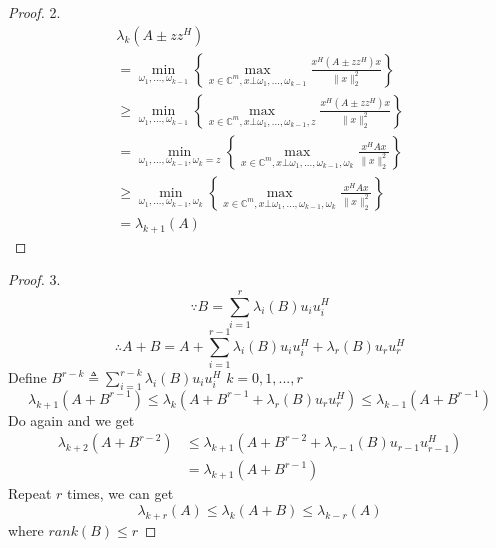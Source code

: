 \begin{multicols}{2}
\begin{proof} 2.
    \[
        \begin{array}{l}
            \lambda_k(A \pm zz^H) \\ 
            = \underset{\omega_1,...,\omega_{k-1}}{\min} \left\{\underset{x\in\mathbb{C}^m,x\bot \omega_1,...,\omega_{k-1}}{\max} \frac{x^H(A\pm zz^H)x}{\|x\|_2^2}\right\} \\
            \geq \underset{\omega_1,...,\omega_{k-1}}{\min} \left\{\underset{x\in\mathbb{C}^m,x\bot \omega_1,...,\omega_{k-1},\boxed{z}}{\max} \frac{x^H(A\pm zz^H)x}{\|x\|_2^2}\right\} \\
            = \underset{\omega_1,...,\omega_{k-1},\omega_k=z}{\min} \left\{\underset{x\in\mathbb{C}^m,x\bot \omega_1,...,\omega_{k-1},\omega_k}{\max} \frac{x^HAx}{\|x\|_2^2}\right\} \\
            \geq \underset{\omega_1,...,\omega_{k-1},\omega_k}{\min} \left\{\underset{x\in\mathbb{C}^m,x\bot \omega_1,...,\omega_{k-1},\omega_k}{\max} \frac{x^HAx}{\|x\|_2^2}\right\} \\
            = \lambda_{k+1}(A)
        \end{array}
    \]
\end{proof}

\begin{proof} 3.
    \[
        \because B=\sum_{i=1}^r \lambda_i(B)u_iu_i^H
    \]
    \[
        \therefore A+B = A + \sum_{i=1}^{r-1} \lambda_i(B)u_iu_i^H + \lambda_r(B)u_ru_r^H
    \]
    Define $B^{r-k}\triangleq \sum_{i=1}^{r-k} \lambda_i(B)u_iu_i^H$ $k=0,1,...,r$
    \[
        \lambda_{k+1}(A+B^{r-1}) \leq \lambda_k(A + B^{r-1} + \lambda_r(B)u_ru_r^H) \leq \lambda_{k-1}(A+B^{r-1})
    \]
    Do again and we get 
    \[
        \begin{array}{ll}
            \lambda_{k+2}(A+B^{r-2}) & \leq \lambda_{k+1}(A + B^{r-2} + \lambda_{r-1}(B)u_{r-1}u_{r-1}^H) \\ &= \lambda_{k+1}(A+B^{r-1})
        \end{array}
    \]
    Repeat $r$ times, we can get 
    \[
        \lambda_{k+r}(A) \leq \lambda_k(A+B) \leq \lambda_{k-r}(A)
    \]
    where $rank(B)\leq r$
\end{proof}


\end{multicols}
